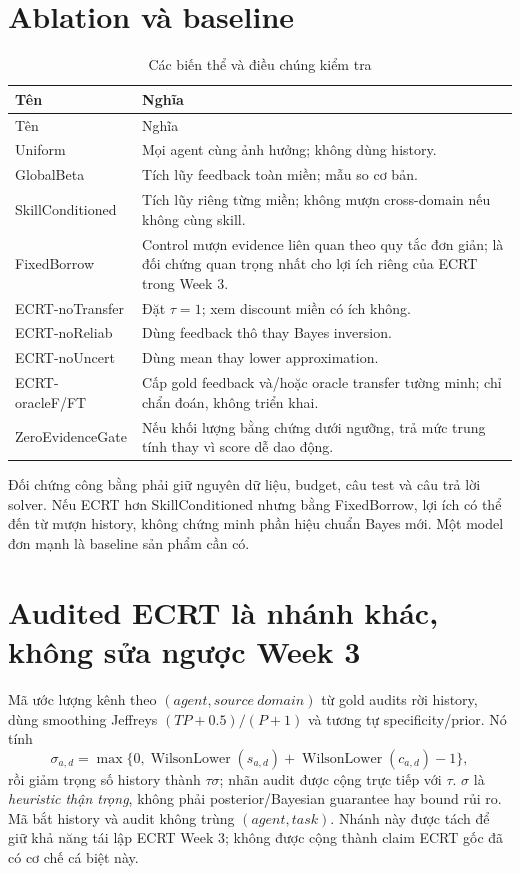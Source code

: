 \documentclass[11pt,a4paper,openany]{book}
\newcommand{\repo}[1]{\path{#1}}
\begin{document}
\section{Ablation và baseline}
\begin{longtable}{p{38mm}p{102mm}}\caption{Các biến thể và điều chúng kiểm tra}\label{tab:ecrtablation}\\\toprule Tên & Nghĩa\\\midrule\endfirsthead\toprule Tên & Nghĩa\\\midrule\endhead
Uniform & Mọi agent cùng ảnh hưởng; không dùng history.\\
GlobalBeta & Tích lũy feedback toàn miền; mẫu so cơ bản.\\
SkillConditioned & Tích lũy riêng từng miền; không mượn cross-domain nếu không cùng skill.\\
FixedBorrow & Control mượn evidence liên quan theo quy tắc đơn giản; là đối chứng quan trọng nhất cho lợi ích riêng của ECRT trong Week 3.\\
ECRT-noTransfer & Đặt \(\tau=1\); xem discount miền có ích không.\\
ECRT-noReliab & Dùng feedback thô thay Bayes inversion.\\
ECRT-noUncert & Dùng mean thay lower approximation.\\
ECRT-oracleF/FT & Cấp gold feedback và/hoặc oracle transfer tường minh; chỉ chẩn đoán, không triển khai.\\
ZeroEvidenceGate & Nếu khối lượng bằng chứng dưới ngưỡng, trả mức trung tính thay vì score dễ dao động.\\\bottomrule\end{longtable}
Đối chứng công bằng phải giữ nguyên dữ liệu, budget, câu test và câu trả lời solver. Nếu ECRT hơn SkillConditioned nhưng bằng FixedBorrow, lợi ích có thể đến từ mượn history, không chứng minh phần hiệu chuẩn Bayes mới. Một model đơn mạnh là baseline sản phẩm cần có.

\section{Audited ECRT là nhánh khác, không sửa ngược Week 3}
Mã \repo{audited.py} ước lượng kênh theo \((agent,source\ domain)\) từ gold audits rời history, dùng smoothing Jeffreys \((TP+0.5)/(P+1)\) và tương tự specificity/prior. Nó tính
\begin{equation}\label{eq:signal}\sigma_{a,d}=\max\{0,\operatorname{WilsonLower}(s_{a,d})+\operatorname{WilsonLower}(c_{a,d})-1\},
\end{equation}
rồi giảm trọng số history thành \(\tau\sigma\); nhãn audit được cộng trực tiếp với \(\tau\). \(\sigma\) là \emph{heuristic thận trọng}, không phải posterior/Bayesian guarantee hay bound rủi ro. Mã bắt history và audit không trùng \((agent,task)\). Nhánh này được tách để giữ khả năng tái lập ECRT Week 3; không được cộng thành claim ECRT gốc đã có cơ chế cá biệt này.
\end{document}
